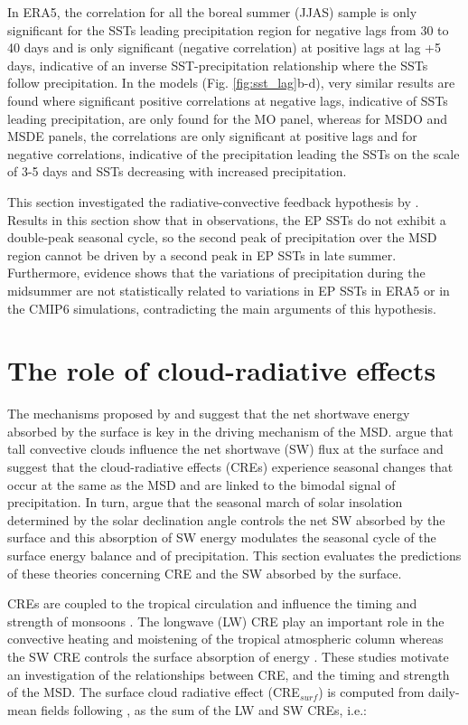 In ERA5, the correlation for all the boreal summer (JJAS) sample is only significant for the SSTs leading  precipitation region for negative lags from 30 to 40 days and is only significant (negative correlation) at positive lags at lag +5 days, indicative of an inverse SST-precipitation relationship where the SSTs follow precipitation. 
In the models (Fig. \ref{fig:sst_lag}b-d), very similar results are found where significant positive correlations at negative lags, indicative of SSTs leading precipitation, are only found for the MO panel, whereas for MSDO and MSDE panels, the correlations are only significant at positive lags and for negative correlations, indicative of the precipitation leading the SSTs on the scale of 3-5 days and SSTs decreasing with increased precipitation.

This section investigated the radiative-convective feedback hypothesis by \cite{magana1999}.
Results in this section show that in observations, the EP SSTs do not exhibit a double-peak seasonal cycle, so the second peak of precipitation over the MSD region cannot be driven by a second peak in EP SSTs in late summer. Furthermore, evidence shows that the variations of precipitation during the midsummer are not statistically related to variations in EP SSTs in ERA5 or in the CMIP6 simulations, contradicting the main arguments of this hypothesis.

\section{The role of cloud-radiative effects}

The mechanisms proposed by \cite{magana1999} and \cite{karnauskas2013} suggest that the net shortwave energy absorbed by the surface is key in the driving mechanism of the MSD. \cite{magana1999} argue that tall convective clouds influence the net shortwave (SW) flux at the surface and suggest that the cloud-radiative effects (CREs) experience seasonal changes that occur at the same as the MSD and are linked to the bimodal signal of precipitation. 
In turn, \cite{karnauskas2013} argue that the seasonal march of solar insolation determined by the solar declination angle controls the net SW absorbed by the surface and this absorption of SW energy modulates the seasonal cycle of the surface energy balance and of precipitation.
This section evaluates the predictions of these theories concerning CRE and the SW absorbed by the surface. 

CREs are coupled to the tropical circulation \citep{bony2004dynamic,webb2017} and influence the timing and strength of monsoons \citep{guo2015,byrne2020}. 
The longwave (LW) CRE play an important role in the convective heating and moistening of the tropical atmospheric column whereas the SW CRE controls the surface absorption of energy \citep{allan2011}. 
These studies motivate an investigation of the relationships between CRE, and the timing and strength of the MSD. The surface cloud radiative effect (CRE$_{surf}$) is computed from daily-mean fields following \cite{allan2011}, as the sum of the LW and SW CREs, i.e.:

